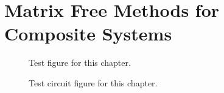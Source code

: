 
\chapter{Matrix Free Methods for Composite Systems}\label{chp:modeling}
\begin{figure}[htbp]
    \centering
    
    \caption{Test figure for this chapter.}
\end{figure}
\begin{figure}[htbp]
    \centering
    
    \caption{Test circuit figure for this chapter.}
\end{figure}

